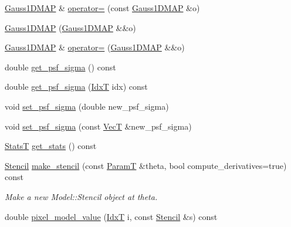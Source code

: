 \begin{DoxyCompactItemize}
\item 
\hyperlink{classmappel_1_1Gauss1DMAP}{Gauss1\+D\+M\+AP} \& \hyperlink{classmappel_1_1Gauss1DMAP_afec3cf3e6adcd8b73100e9dc121198b7}{operator=} (const \hyperlink{classmappel_1_1Gauss1DMAP}{Gauss1\+D\+M\+AP} \&o)
\item 
\hyperlink{classmappel_1_1Gauss1DMAP_a63d9289858c60e5553b975383086b09f}{Gauss1\+D\+M\+AP} (\hyperlink{classmappel_1_1Gauss1DMAP}{Gauss1\+D\+M\+AP} \&\&o)
\item 
\hyperlink{classmappel_1_1Gauss1DMAP}{Gauss1\+D\+M\+AP} \& \hyperlink{classmappel_1_1Gauss1DMAP_af33c269d5aa6f135c2c0efd026f9cf56}{operator=} (\hyperlink{classmappel_1_1Gauss1DMAP}{Gauss1\+D\+M\+AP} \&\&o)
\item 
double \hyperlink{classmappel_1_1Gauss1DModel_a8786ff874e58de054ab3633a5f201192}{get\+\_\+psf\+\_\+sigma} () const 
\item 
double \hyperlink{classmappel_1_1Gauss1DModel_ae7bd64fb97894f9657be0a4b542aa3c6}{get\+\_\+psf\+\_\+sigma} (\hyperlink{namespacemappel_ab17ec0f30b61ece292439d7ece81d3a8}{IdxT} idx) const 
\item 
void \hyperlink{classmappel_1_1Gauss1DModel_a5c09d4cf98de58fb67d881b560e6a3e8}{set\+\_\+psf\+\_\+sigma} (double new\+\_\+psf\+\_\+sigma)
\item 
void \hyperlink{classmappel_1_1Gauss1DModel_accb0aad54534660e5acd2d6fc01268f1}{set\+\_\+psf\+\_\+sigma} (const \hyperlink{namespacemappel_a2225ad69f358daa3f4f99282a35b9a3a}{VecT} \&new\+\_\+psf\+\_\+sigma)
\item 
\hyperlink{namespacemappel_a04ab395b0cf82c4ce68a36b2212649a5}{StatsT} \hyperlink{classmappel_1_1Gauss1DModel_a61904b6e14e7429ee58175cb54259ed9}{get\+\_\+stats} () const 
\item 
\hyperlink{classmappel_1_1Gauss1DModel_1_1Stencil}{Stencil} \hyperlink{classmappel_1_1Gauss1DModel_a3068438846f29467b2df5a8504151c20}{make\+\_\+stencil} (const \hyperlink{classmappel_1_1PointEmitterModel_a665ec6aea3aac139bb69a23c06d4b9a1}{ParamT} \&theta, bool compute\+\_\+derivatives=true) const 
\begin{DoxyCompactList}\small\item\em Make a new Model\+::\+Stencil object at theta. \end{DoxyCompactList}\item 
double \hyperlink{classmappel_1_1Gauss1DModel_af26feda273232841ae28b85b0dbab439}{pixel\+\_\+model\+\_\+value} (\hyperlink{namespacemappel_ab17ec0f30b61ece292439d7ece81d3a8}{IdxT} i, const \hyperlink{classmappel_1_1Gauss1DModel_1_1Stencil}{Stencil} \&s) const 

\end{DoxyCompactItemize}
